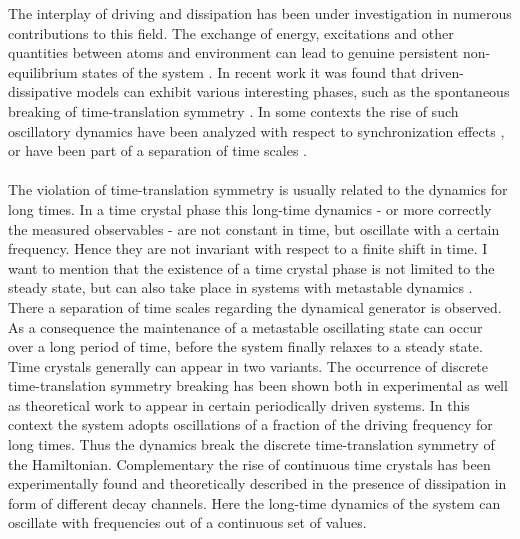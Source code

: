 The interplay of driving and dissipation has been under investigation in numerous contributions to this field. The exchange of energy, excitations and other quantities between atoms and environment can lead to genuine persistent non-equilibrium states of the system \cite{diehl_quantum_2008,diehl_dynamical_2010,cabot_metastable_2022,mattes_entangled_2023,krishna_measurement-induced_2023,jin_photon_2013,marcuzzi_absorbing_2016}. In recent work it was found that driven-dissipative models can exhibit various interesting phases, %
such as the spontaneous breaking of time-translation symmetry \cite{mattes_entangled_2023,krishna_measurement-induced_2023}. In some contexts the rise of such oscillatory dynamics have been analyzed with respect to synchronization effects \cite{cabot_quantum_2019,cabot_metastable_2021,giorgi_transient_2019,weiner_phase_2017}, 
or have been part of a separation of time scales \cite{labay-mora_quantum_2023}.\\\\
The violation of time-translation symmetry is usually related to the dynamics for long times. In a time crystal phase this long-time dynamics - or more correctly the measured observables - are not constant in time, but oscillate with a certain frequency. Hence they are not invariant with respect to a finite shift in time. I want to mention that the existence of a time crystal phase is not limited to the steady state, but can also take place in systems with metastable dynamics \cite{else_prethermal_2017,gambetta_discrete_2019}. There a separation of time scales regarding the dynamical generator is observed. As a consequence the maintenance of a metastable oscillating state can occur over a long period of time, before the system finally relaxes to a steady state. \\Time crystals generally can appear in two variants. The occurrence of discrete time-translation symmetry breaking has been shown both in experimental  \cite{choi_observation_2017,zhang_observation_2017} as well as theoretical work \cite{yao_discrete_2017,sacha_time_2018} to appear in certain periodically driven systems. In this context the system adopts oscillations of a fraction of the driving frequency for long times. Thus the dynamics break the discrete time-translation symmetry of the Hamiltonian. Complementary the rise of continuous time crystals has been experimentally found \cite{kesler_emergent_2019} and theoretically described \cite{tucker_shattered_2018,iemini_boundary_2018,owen_quantum_2018} in the presence of dissipation in form of different decay channels. Here the long-time dynamics of the system can oscillate with frequencies out of a continuous set of values. 

